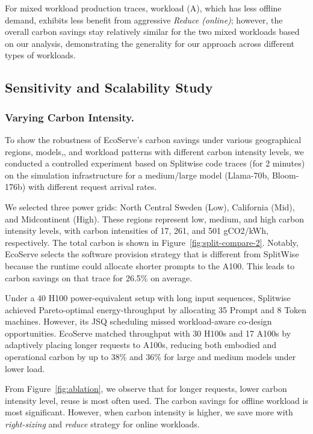 For mixed workload production traces, workload (A), which has less offline demand, exhibits less benefit from aggressive \textit{Reduce (online)}; however, the overall carbon savings stay relatively similar for the two mixed workloads based on our analysis, demonstrating the generality for our approach across different types of workloads.

\subsection{Sensitivity and Scalability Study} \label{sec:sensitivity}

\subsubsection{Varying Carbon Intensity.}
To show the robustness of EcoServe's carbon savings under various geographical regions, models,, and workload patterns with different carbon intensity levels, we conducted a controlled experiment based on Splitwise code traces (for 2 minutes) on the simulation infrastructure for a medium/large model (Llama-70b, Bloom-176b) with different request arrival rates. 

We selected three power
grids: North Central Sweden (Low), California (Mid), and
Midcontinent (High). These regions represent low, medium,
and high carbon intensity levels, with carbon intensities of
17, 261, and 501 gCO2/kWh, respectively. The total carbon is shown in Figure~\ref{fig:split-compare-2}. Notably, EcoServe selects the software provision strategy that is different from SplitWise because the runtime could allocate shorter prompts to the A100. This leads to carbon savings on that trace for 26.5\% on average. 

Under a 40 H100 power-equivalent setup with
long input sequences, Splitwise achieved Pareto-optimal energy-throughput
by allocating 35 Prompt and 8 Token machines. However, its JSQ scheduling
missed workload-aware co-design opportunities. EcoServe matched throughput
with 30 H100s and 17 A100s by adaptively placing longer requests to
A100s, reducing both embodied and operational carbon by up to 38\% and 36\% for large and medium models under lower load. 

From Figure~\ref{fig:ablation}, we observe that for longer requests, lower carbon intensity level, reuse is most often used. The carbon savings for offline workload is most significant. However, when carbon intensity is higher, we save more with \textit{right-sizing} and \textit{reduce} strategy for online workloads.    






